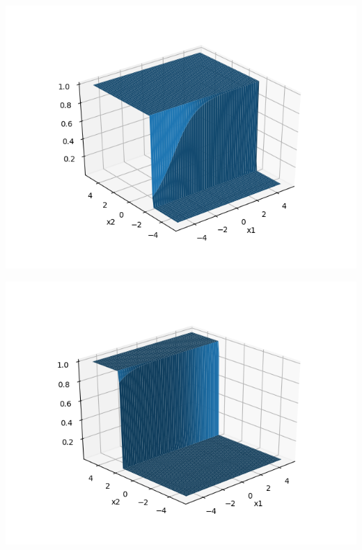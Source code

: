 \documentclass[solution,addpoints,12pt]{exam}
\begin{document}
\begin{questions}
\begin{parts}
                  \begin{solution}
                  		\begin{center}
                  			\includegraphics[scale=0.8]{h_11}
                  			\label{fig:h11}
                  		\end{center}
                  		
                  		\begin{center}
                  			\includegraphics[scale=0.8]{h_12}
                  			\label{fig:h12}
                  		\end{center}
                  		

\end{solution}
\end{parts}
\end{questions}
\end{document}
